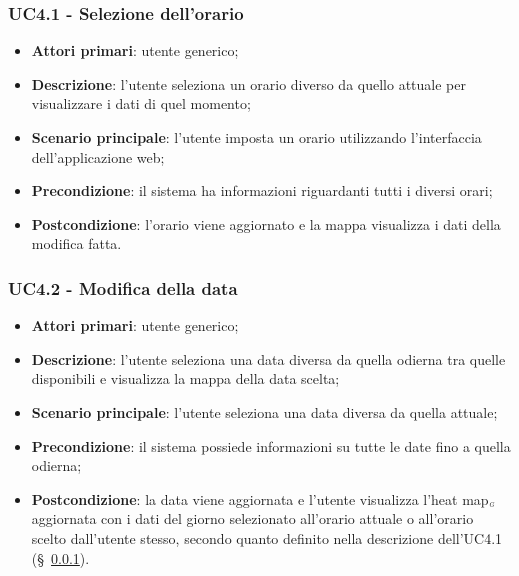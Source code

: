 \subsubsection{UC4.1 - Selezione dell’orario}\label{selezioneOrario}
\begin{itemize}
	\item \textbf{Attori primari}: utente generico;
	\item \textbf{Descrizione}: l’utente seleziona un orario diverso da quello attuale per visualizzare i dati di quel momento;
	\item \textbf{Scenario principale}: l’utente imposta un orario utilizzando l’interfaccia dell’applicazione web;
	\item \textbf{Precondizione}: il sistema ha informazioni riguardanti tutti i diversi orari; %
	\item \textbf{Postcondizione}:  l’orario viene aggiornato e la mappa visualizza i dati della modifica fatta.
\end{itemize}

\subsubsection{UC4.2 - Modifica della data}\label{modificaData}
\begin{itemize}
	\item \textbf{Attori primari}: utente generico;
	\item \textbf{Descrizione}: l’utente seleziona una data diversa da quella odierna tra quelle disponibili e visualizza la mappa della data scelta;
	\item \textbf{Scenario principale}: l’utente seleziona una data diversa da quella attuale;
	\item \textbf{Precondizione}: il sistema possiede informazioni su tutte le date fino a quella odierna;
	\item \textbf{Postcondizione}: la data viene aggiornata e l’utente visualizza l’heat map$_{\scaleto{G}{3pt}}$ aggiornata con i dati del giorno selezionato all’orario attuale o all’orario scelto dall’utente stesso, secondo quanto definito nella descrizione dell’UC4.1 (\S~\ref{selezioneOrario}).
\end{itemize}

